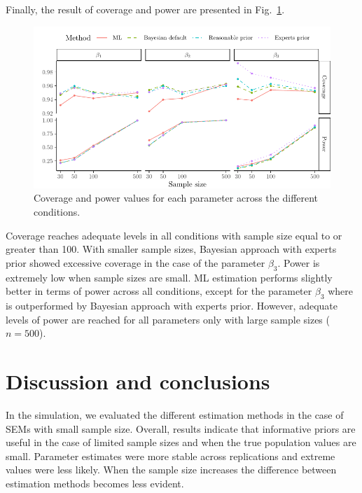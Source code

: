 \documentclass[graybox]{svmult}
\begin{document}
Finally, the result of coverage and power are presented in Fig.~\ref{fig:Plot_coverage_power}.
\begin{figure}[b]
	\sidecaption
	\includegraphics[width = .8\textwidth]{figure/Plot_coverage_power}
	\caption{Coverage and power values for each parameter across the different conditions.}
	\label{fig:Plot_coverage_power}
\end{figure}
Coverage reaches adequate levels in all conditions  with sample size  equal to or greater than 100. With smaller sample sizes, Bayesian approach with experts prior showed excessive coverage in the case of the parameter $\beta_3$. Power is extremely low when sample sizes are small. ML estimation performs slightly better in terms of power across all conditions, except for the  parameter $\beta_3$ where is outperformed by Bayesian approach with experts prior. However, adequate levels of power are reached for all parameters only with large sample sizes ($n = 500$).

\section{Discussion and conclusions}

\label{sec:dicussion}


In the simulation, we evaluated the different estimation methods in the case of SEMs with small sample size. Overall, results indicate that informative priors are useful in the case of limited sample sizes and when the true population values are small. Parameter estimates were more stable  across replications and extreme values were less likely. When the sample size increases the difference between estimation methods becomes less evident.
\end{document}
